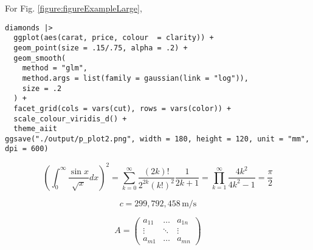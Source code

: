 \documentclass[a4paper, 9pt, twocolumn]{extarticle}
\begin{document}
For Fig. \ref{figure:figureExampleLarge},

\begin{verbatim}
diamonds |> 
  ggplot(aes(carat, price, colour  = clarity)) +
  geom_point(size = .15/.75, alpha = .2) +
  geom_smooth(
    method = "glm", 
    method.args = list(family = gaussian(link = "log")),
    size = .2
  ) +
  facet_grid(cols = vars(cut), rows = vars(color)) +
  scale_colour_viridis_d() +
  theme_aiit
ggsave("./output/p_plot2.png", width = 180, height = 120, unit = "mm", dpi = 600)
\end{verbatim}



\begin{equation}
\left( \int_0^\infty \frac{\sin x}{\sqrt{x}} dx \right)^2=
\sum_{k=0}^\infty \frac{(2k)!}{2^{2k}(k!)^2} \frac{1}{2k+1}=
\prod_{k=1}^\infty \frac{4k^2}{4k^2 -1}= \frac{\pi}{2} \label{eq:example}
\end{equation}

\begin{equation}
  c = 299{,}792{,}458 \, \mathrm{m/s}
\end{equation}

\begin{equation}
  A = \begin{pmatrix}
        a_{11} & \ldots & a_{1n} \\
        \vdots & \ddots & \vdots \\
        a_{m1} & \ldots & a_{mn}
      \end{pmatrix}
\end{equation}

\printbibliography
 
%  
%  
%  
%  
%  
\end{document}
